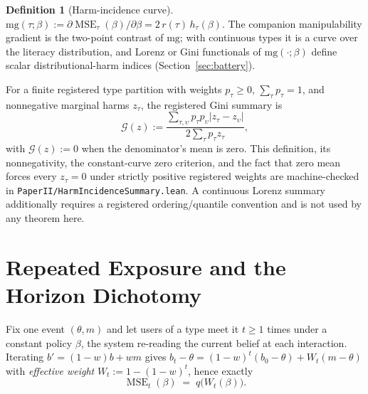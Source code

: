 \documentclass[11pt]{article}
\theoremstyle{definition}
\newtheorem{definition}[theorem]{Definition}
\theoremstyle{remark}
\numberwithin{equation}{section}
\DeclareMathOperator{\MSE}{MSE}
\begin{document}
\begin{definition}[Harm-incidence curve]\label{def:hic}
$\mathrm{mg}(\tau;\beta) := \partial\MSE_\tau(\beta)/\partial\beta = 2\,r(\tau)\,h_\tau(\beta)$. The companion manipulability gradient is the two-point contrast of $\mathrm{mg}$; with continuous types it is a curve over the literacy distribution, and Lorenz or Gini functionals of $\mathrm{mg}(\cdot;\beta)$ define scalar distributional-harm indices (Section~\ref{sec:battery}).

For a finite registered type partition with weights $p_\tau\ge0$,
$\sum_\tau p_\tau=1$, and nonnegative marginal harms $z_\tau$, the registered
Gini summary is
\[
 \mathcal G(z):=
 \frac{\sum_{\tau,\upsilon}p_\tau p_\upsilon
   |z_\tau-z_\upsilon|}{2\sum_\tau p_\tau z_\tau},
\]
with $\mathcal G(z):=0$ when the denominator's mean is zero. This definition,
its nonnegativity, the constant-curve zero criterion, and the fact that zero
mean forces every $z_\tau=0$ under strictly positive registered weights are
machine-checked in \texttt{PaperII/HarmIncidenceSummary.lean}. A continuous
Lorenz summary additionally requires a registered ordering/quantile
convention and is not used by any theorem here.
\end{definition}

\section{Repeated Exposure and the Horizon Dichotomy}\label{sec:horizon}

Fix one event $(\theta, m)$ and let users of a type meet it $t \ge 1$ times under a constant policy $\beta$, the system re-reading the current belief at each interaction. Iterating $b' = (1-w)b + wm$ gives $b_t - \theta = (1-w)^t(b_0-\theta) + W_t(m-\theta)$ with \emph{effective weight} $W_t := 1-(1-w)^t$, hence exactly
\begin{equation}\label{eq:mset}
\MSE_t(\beta) \;=\; q\bigl(W_t(\beta)\bigr).
\end{equation}
\end{document}
